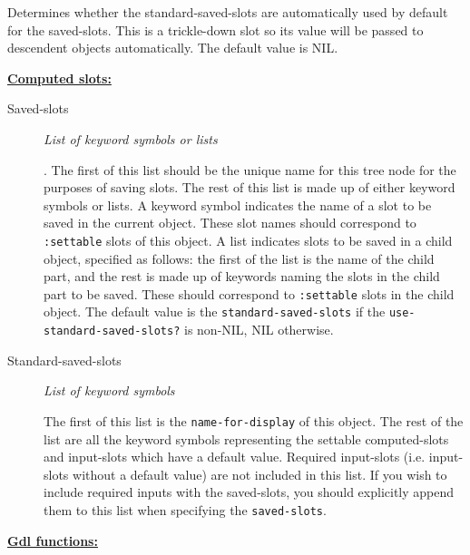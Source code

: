 \documentclass [11pt]{book}
\begin{document}
\begin{itemize}
\begin{description}
 Determines whether the standard-saved-slots are automatically used by default for the
saved-slots. This is a trickle-down slot so its value will be passed to descendent objects automatically.
The default value is NIL.




\end{description}






\textbf{
\underline{Computed slots:}}

\begin{description}

\item [Saved-slots]
\emph{List of keyword symbols or lists}

.
The first of this list should be the unique name for this tree node for the purposes of saving slots.
The rest of this list is made up of either keyword symbols or lists. A keyword symbol indicates the
name of a slot to be saved in the current object. These slot names should correspond to \texttt{:settable}
slots of this object. A list indicates slots to be saved in a child object, specified as
follows: the first of the list is the name of the child part, and the rest is made up of keywords naming
the slots in the child part to be saved. These should correspond to \texttt{:settable}
slots in the child object.
The default value is the \texttt{standard-saved-slots} if the \texttt{use-standard-saved-slots?} is non-NIL, NIL otherwise.




\item [Standard-saved-slots]
\emph{List of keyword symbols}

 The first of this list is the \texttt{name-for-display} of this object. The rest of the list
are all the keyword symbols representing the settable computed-slots and input-slots which have a default value. Required
input-slots (i.e. input-slots without a default value) are not included in this list. If you wish to include required
inputs with the saved-slots, you should explicitly append them to this list when specifying the \texttt{saved-slots}.




\end{description}






\textbf{
\underline{Gdl functions:}}


\end{itemize}
\end{document}
